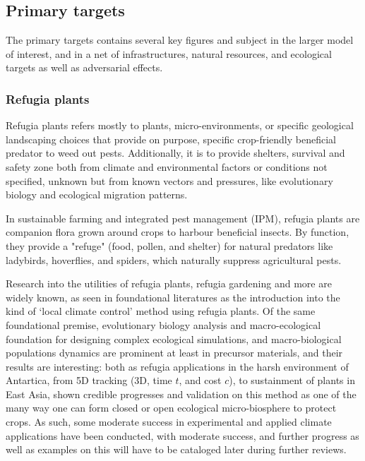 \documentclass[twocolumn,letterpaper, 12pt]{article}
\begin{document}
\subsection{Primary targets}

The primary targets contains several key figures and subject in the larger model of interest, and in a net of infrastructures, natural resources, and ecological targets as well as adversarial effects. 

\subsubsection{Refugia plants}

Refugia plants refers mostly to plants, micro-environments, or specific geological landscaping choices that provide on purpose, specific crop-friendly beneficial predator to weed out pests. Additionally, it is to provide shelters, survival and safety zone both from climate and environmental factors or conditions not specified, unknown but from known vectors and pressures, like evolutionary biology and ecological migration patterns. 

In sustainable farming and integrated pest management (IPM), refugia plants are companion flora grown around crops to harbour beneficial insects. By function, they provide a "refuge" (food, pollen, and shelter) for natural predators like ladybirds, hoverflies, and spiders, which naturally suppress agricultural pests.

Research into the utilities of refugia plants, refugia gardening and more are widely known, as seen in foundational literatures\cite{keppel2012refugia,morelli2016managing} as the introduction into the kind of `local climate control' method using refugia plants. Of the same foundational premise, evolutionary biology analysis and macro-ecological foundation for designing complex ecological simulations, and macro-biological populations dynamics are prominent at least in precursor materials\cite{abbott2000molecular,stewart2010refugia,tang2018identifying}, and their results are interesting: both as refugia applications in the harsh environment of Antartica, from 5D tracking (3D, time $t$, and cost $c$), to sustainment of plants in East Asia, shown credible progresses and validation on this method as one of the many way one can form closed or open ecological micro-biosphere to protect crops. As such, some moderate success in experimental and applied climate applications have been conducted, with moderate success\cite{baumgartner2018identifying,guim2024refugia}, and further progress as well as examples on this will have to be cataloged later during further reviews. 
\end{document}
